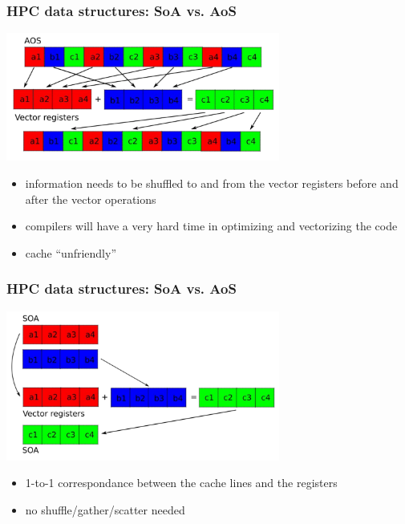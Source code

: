 \begin{frame}[containsverbatim]
\frametitle{HPC data structures: SoA vs. AoS}
\begin{center}
\includegraphics[width=9cm]{DayGilles/images/soa-aos2.jpg}
\end{center}
\begin{itemize}
\item information needs to be shuffled to and from the vector registers before and after the vector operations
\item compilers will have a very hard time in optimizing and vectorizing the code 
\item cache ``unfriendly''
\end{itemize}
\end{frame}

\begin{frame}[containsverbatim]
\frametitle{HPC data structures: SoA vs. AoS}
\begin{center}
\includegraphics[width=9cm]{DayGilles/images/soa-aos3.jpg}
\end{center}
\begin{itemize}
\item 1-to-1 correspondance between the cache lines and the registers
\item no shuffle/gather/scatter needed
\end{itemize}
\end{frame}


